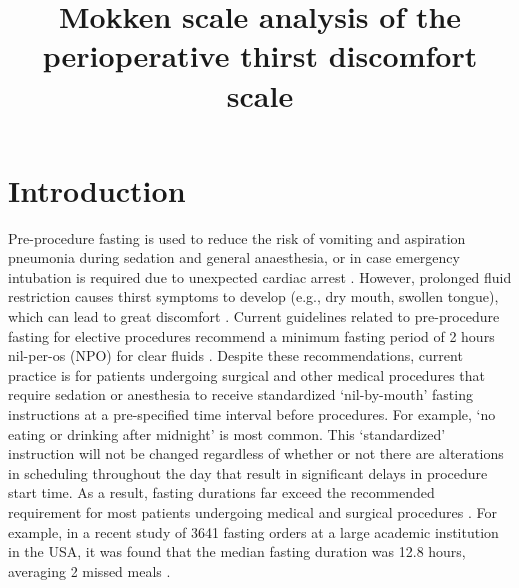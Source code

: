 \documentclass[12pt,twocolumn,twoside,]{pinp}
\title{Mokken scale analysis of the perioperative thirst discomfort
scale}
\author[]{}
\begin{document}
\verticaladjustment{-2pt}

\maketitle
\thispagestyle{firststyle}



\hypertarget{introduction}{%
\section{Introduction}\label{introduction}}

Pre-procedure fasting is used to reduce the risk of vomiting and
aspiration pneumonia during sedation and general anaesthesia, or in case
emergency intubation is required due to unexpected cardiac arrest
\citep{hamid2014pre, osborne2002preoperative}. However, prolonged fluid
restriction causes thirst symptoms to develop (e.g., dry mouth, swollen
tongue), which can lead to great discomfort
\citep{madsen1998perioperative}. Current guidelines related to
pre-procedure fasting for elective procedures recommend a minimum
fasting period of 2 hours nil-per-os (NPO) for clear fluids
\citep{dobsonGuidelinesPracticeAnesthesia2018}. Despite these
recommendations, current practice is for patients undergoing surgical
and other medical procedures that require sedation or anesthesia to
receive standardized `nil-by-mouth' fasting instructions at a
pre-specified time interval before procedures. For example, `no eating
or drinking after midnight' is most common. This `standardized'
instruction will not be changed regardless of whether or not there are
alterations in scheduling throughout the day that result in significant
delays in procedure start time. As a result, fasting durations far
exceed the recommended requirement for most patients undergoing medical
and surgical procedures
\citep{de2014actual, sorita2015frequency, spitz2017impact}. For example,
in a recent study of 3641 fasting orders at a large academic institution
in the USA, it was found that the median fasting duration was 12.8
hours, averaging 2 missed meals \citep{sorita2015frequency}.
\end{document}
